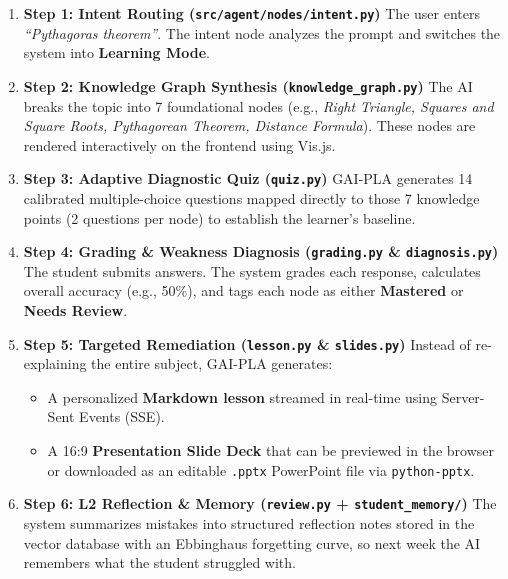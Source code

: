 \documentclass[11pt,a4paper]{article}
\begin{document}
\begin{enumerate}[leftmargin=*]
    \item \textbf{Step 1: Intent Routing (\texttt{src/agent/nodes/intent.py})}
    The user enters \textit{``Pythagoras theorem''}. The intent node analyzes the prompt and switches the system into \textbf{Learning Mode}.
    
    \item \textbf{Step 2: Knowledge Graph Synthesis (\texttt{knowledge\_graph.py})}
    The AI breaks the topic into 7 foundational nodes (e.g., \textit{Right Triangle, Squares and Square Roots, Pythagorean Theorem, Distance Formula}). These nodes are rendered interactively on the frontend using Vis.js.
    
    \item \textbf{Step 3: Adaptive Diagnostic Quiz (\texttt{quiz.py})}
    GAI-PLA generates 14 calibrated multiple-choice questions mapped directly to those 7 knowledge points (2 questions per node) to establish the learner's baseline.
    
    \item \textbf{Step 4: Grading \& Weakness Diagnosis (\texttt{grading.py} \& \texttt{diagnosis.py})}
    The student submits answers. The system grades each response, calculates overall accuracy (e.g., 50\%), and tags each node as either \textbf{Mastered} or \textbf{Needs Review}.
    
    \item \textbf{Step 5: Targeted Remediation (\texttt{lesson.py} \& \texttt{slides.py})}
    Instead of re-explaining the entire subject, GAI-PLA generates:
    \begin{itemize}[noitemsep]
        \item A personalized \textbf{Markdown lesson} streamed in real-time using Server-Sent Events (SSE).
        \item A 16:9 \textbf{Presentation Slide Deck} that can be previewed in the browser or downloaded as an editable \texttt{.pptx} PowerPoint file via \texttt{python-pptx}.
    \end{itemize}
    
    \item \textbf{Step 6: L2 Reflection \& Memory (\texttt{review.py} + \texttt{student\_memory/})}
    The system summarizes mistakes into structured reflection notes stored in the vector database with an Ebbinghaus forgetting curve, so next week the AI remembers what the student struggled with.
\end{enumerate}
\end{document}
